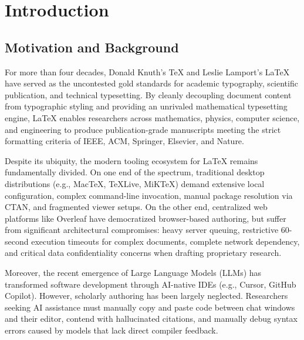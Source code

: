 \documentclass[12pt,a4paper]{article}
\begin{document}
\clearpage
{}
\setcounter{page}{1}

\section{Introduction}\label{sec:intro}

\subsection{Motivation and Background}
For more than four decades, Donald Knuth's \TeX{} and Leslie Lamport's \LaTeX{} have served as the uncontested gold standards for academic typography, scientific publication, and technical typesetting. By cleanly decoupling document content from typographic styling and providing an unrivaled mathematical typesetting engine, \LaTeX{} enables researchers across mathematics, physics, computer science, and engineering to produce publication-grade manuscripts meeting the strict formatting criteria of IEEE, ACM, Springer, Elsevier, and Nature.

Despite its ubiquity, the modern tooling ecosystem for \LaTeX{} remains fundamentally divided. On one end of the spectrum, traditional desktop distributions (e.g., Mac\TeX{}, \TeX{}Live, MiK\TeX{}) demand extensive local configuration, complex command-line invocation, manual package resolution via CTAN, and fragmented viewer setups. On the other end, centralized web platforms like Overleaf have democratized browser-based authoring, but suffer from significant architectural compromises: heavy server queuing, restrictive 60-second execution timeouts for complex documents, complete network dependency, and critical data confidentiality concerns when drafting proprietary research.

Moreover, the recent emergence of Large Language Models (LLMs) has transformed software development through AI-native IDEs (e.g., Cursor, GitHub Copilot). However, scholarly authoring has been largely neglected. Researchers seeking AI assistance must manually copy and paste code between chat windows and their editor, contend with hallucinated citations, and manually debug syntax errors caused by models that lack direct compiler feedback.
\end{document}
